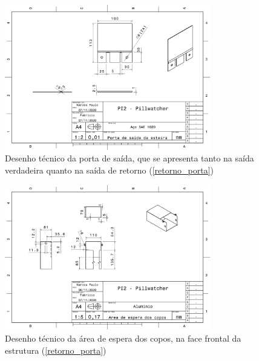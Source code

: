 \begin{apendicesenv}
\begin{figure}[H]
    \centering
    \includegraphics[width=0.8\textwidth]{figuras/estrutura/Desenhos/Porta_Saida.pdf}
    \caption{Desenho técnico da porta de saída, que se apresenta tanto na saída verdadeira quanto na saída de retorno (\ref{retorno_porta})}
    \label{fig:porta_saida}
\end{figure}

\begin{figure}[H]
    \centering
    \includegraphics[width=0.8\textwidth]{figuras/estrutura/Desenhos/Area de espera dos copos.pdf}
    \caption{Desenho técnico da área de espera dos copos, na face frontal da estrutura (\ref{retorno_porta})}
    \label{fig:area_espera}
\end{figure}


\end{apendicesenv}
